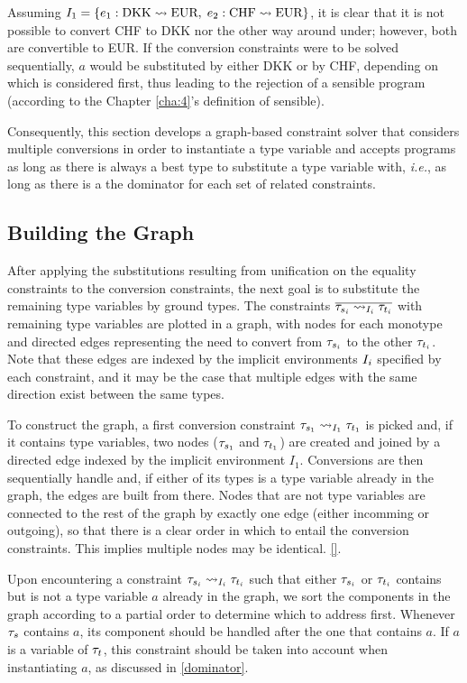 Assuming $\imEnv_1 = \{e_1 : \text{DKK} \rightsquigarrow \text{EUR}, \;e_2 : \text{CHF} \rightsquigarrow \text{EUR}\}$, it is clear that it is not possible to convert CHF to DKK nor the other way around under; however, both are convertible to EUR. If the conversion constraints were to be solved sequentially, $a$ would be substituted by either DKK or by CHF, depending on which is considered first, thus leading to the rejection of a sensible program (according to the Chapter \ref{cha:4}'s definition of sensible).

Consequently, this section develops a graph-based constraint solver that considers multiple conversions in order to instantiate a type variable and accepts programs as long as there is always a best type to substitute a type variable with, \textit{i.e.}, as long as there is a the dominator for each set of related constraints.

\subsection{Building the Graph}
\label{graph}
After applying the substitutions resulting from unification on the equality constraints to the conversion constraints, the next goal is to substitute the remaining type variables by ground types. The constraints $\overline{\convX{\imEnv_i}{\type_{s_i}}{\type_{t_i}}}$ with remaining type variables are plotted in a graph, with nodes for each monotype and directed edges representing the need to convert from $\type_{s_i}$ to the other $\type_{t_i}$. Note that these edges are indexed by the implicit environments $\imEnv_i$ specified by each constraint, and it may be the case that multiple edges with the same direction exist between the same types.

To construct the graph, a first conversion constraint $\convX{\imEnv_1}{\type_{s_1}}{\type_{t_1}}$ is picked and, if it contains type variables, two nodes ($\type_{s_1}$ and $\type_{t_1}$) are created and joined by a directed edge indexed by the implicit environment $I_1$. Conversions are then sequentially handle and, if either of its types is a type variable already in the graph, the edges are built from there. Nodes that are not type variables are connected to the rest of the graph by exactly one edge (either incomming or outgoing), so that there is a clear order in which to entail the conversion constraints. This implies multiple nodes may be identical. \ref{}.

Upon encountering a constraint $\convX{\imEnv_i}{\type_{s_i}}{\type_{t_i}}$ such that either $\type_{s_i}$ or $\type_{t_i}$ contains but is not a type variable $a$ already in the graph, we sort the components in the graph according to a partial order to determine which to address first. Whenever $\type_s$ contains $a$, its component should be handled after the one that contains $a$. If $a$ is a variable of $\type_t$, this constraint should be taken into account when instantiating $a$, as discussed in \ref{dominator}. 

